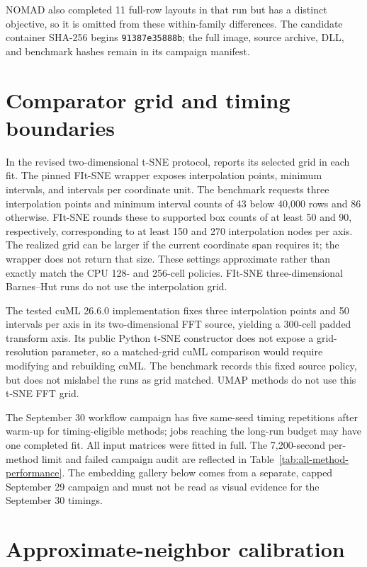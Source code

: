 \documentclass[article]{jss}
\begin{document}
NOMAD also completed 11 full-row layouts in that run but has a distinct
objective, so it is omitted from these within-family differences. The
candidate container SHA-256 begins \texttt{91387e35888b}; the full image,
source archive, DLL, and benchmark hashes remain in its campaign manifest.

\section{Comparator grid and timing boundaries}

In the revised two-dimensional t-SNE protocol,  reports its
selected grid in each fit. The pinned FIt-SNE wrapper exposes interpolation
points, minimum intervals, and intervals per coordinate unit. The benchmark
requests three interpolation points and minimum interval counts of 43 below
40,000 rows and 86 otherwise. FIt-SNE rounds these to supported box counts
of at least 50 and 90, respectively, corresponding to at least 150 and 270
interpolation nodes per axis. The realized grid can be larger if the current
coordinate span requires it; the wrapper does not return that size. These
settings approximate rather than exactly match the  CPU
128- and 256-cell policies. FIt-SNE three-dimensional Barnes--Hut runs do
not use the interpolation grid.

The tested cuML 26.6.0 implementation fixes three interpolation points and
50 intervals per axis in its two-dimensional FFT source, yielding a
300-cell padded transform axis. Its public Python t-SNE constructor does not
expose a grid-resolution parameter, so a matched-grid cuML comparison would
require modifying and rebuilding cuML. The benchmark records this fixed
source policy, but does not mislabel the runs as grid matched. UMAP methods
do not use this t-SNE FFT grid.

The September 30 workflow campaign has five same-seed timing repetitions
after warm-up for timing-eligible methods; jobs reaching the long-run
budget may have one completed fit. All input matrices were fitted in full.
The 7,200-second per-method limit and failed campaign audit are reflected
in Table~\ref{tab:all-method-performance}. The embedding gallery below
comes from a separate, capped September 29 campaign and must not be
read as visual evidence for the September 30 timings.

\section{Approximate-neighbor calibration}
\end{document}
